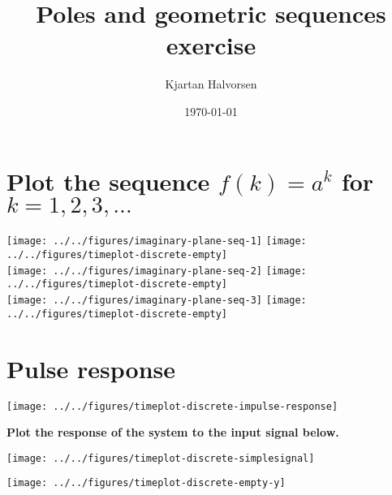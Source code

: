 \documentclass[letterpaper]{scrartcl}
\author{Kjartan Halvorsen}
\date{\today}
\title{Poles and geometric sequences exercise}
\begin{document}
\maketitle


\section*{Plot the sequence \(f(k) = a^k\) for \(k=1,2,3,\ldots\)}
\label{sec-1}

\begin{center}
\texttt{[image: ../../figures/imaginary-plane-seq-1]}
\texttt{[image: ../../figures/timeplot-discrete-empty]}\\
\texttt{[image: ../../figures/imaginary-plane-seq-2]}
\texttt{[image: ../../figures/timeplot-discrete-empty]}\\
\texttt{[image: ../../figures/imaginary-plane-seq-3]}
\texttt{[image: ../../figures/timeplot-discrete-empty]}\\
\end{center}

\section*{Pulse response}
\label{sec-2}
\begin{center}
\begin{minipage}[t]{0.5\linewidth}
\centering
{}
\end{minipage}
\texttt{[image: ../../figures/timeplot-discrete-impulse-response]}
\end{center}

\textbf{Plot the response of the system to the input signal below.}

\texttt{[image: ../../figures/timeplot-discrete-simplesignal]}

\vspace*{2mm}

\texttt{[image: ../../figures/timeplot-discrete-empty-y]}
\end{document}
